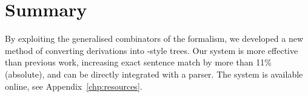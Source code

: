 \section{Summary}

By exploiting the generalised combinators of the \ccg formalism, we developed a new method of converting \ccg derivations into \ptb-style trees.
Our system is more effective than previous work, increasing exact sentence match by more than 11\% (absolute), and can be directly integrated with a \ccg parser.
The system is available online, see Appendix~\ref{chp:resources}.






